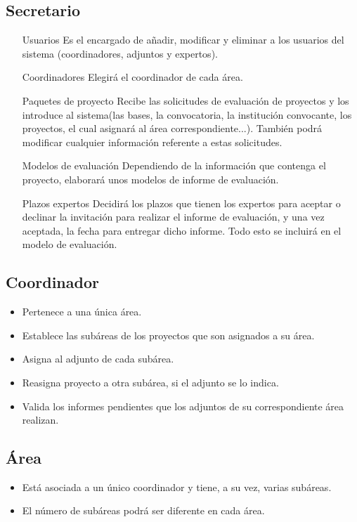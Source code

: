 \documentclass[12pt,a4paper,spanish,twoside]{book}
\begin{document}
\subsection{Secretario}
\begin{itemize}
\item[Usuarios] Es el encargado de añadir, modificar y eliminar a los
  usuarios del sistema (coordinadores, adjuntos y expertos).
\item[Coordinadores] Elegirá el coordinador de cada área.
\item[Paquetes de proyecto] Recibe las solicitudes de evaluación de proyectos
  y los introduce al sistema(las bases, la convocatoria, la institución
  convocante, los proyectos, el cual asignará al área correspondiente...). 
  También podrá modificar cualquier información referente a estas
  solicitudes. 
\item[Modelos de evaluación] Dependiendo de la información que contenga el
  proyecto, elaborará unos modelos de informe de evaluación. 
\item[Plazos expertos] Decidirá los plazos que tienen los expertos para
  aceptar o declinar la invitación para realizar el informe de evaluación,
  y una vez aceptada, la fecha para entregar dicho informe. Todo esto
  se incluirá en el modelo de evaluación.
\end{itemize}

\subsection{Coordinador}
\begin{itemize}
\item Pertenece a una única área.
\item Establece las subáreas de los proyectos que son asignados a su área.
\item Asigna al adjunto de cada subárea.
\item Reasigna proyecto a otra subárea, si el adjunto se lo indica.
\item Valida los informes pendientes que los adjuntos de su correspondiente 
  área realizan.
\end{itemize}

\subsection{Área}
\begin{itemize}
\item Está asociada a un único coordinador y tiene, a su vez, varias subáreas. 
\item El número de subáreas podrá ser diferente en cada área.
\end{itemize}
\end{document}
